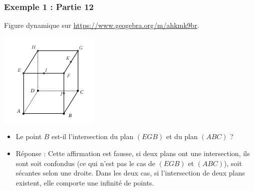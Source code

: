 \documentclass[xcolor=svgnames,t,final]{beamer}
\begin{document}
\begin{frame}

\frametitle{Exemple 1 : Partie 12}

Figure dynamique sur \href{https://www.geogebra.org/m/ahkmk9br}{https://www.geogebra.org/m/ahkmk9br}.


\begin{center}
\includegraphics[scale=0.4]{images/exemple1.png}
\end{center}

\begin{itemize}
\pause \item {\color{blue}  Le point $B$ est-il l'intersection du plan $(EGB)$ et du plan $(ABC)$ ?}
\pause \item {\color{red} Réponse :  Cette affirmation est fausse,  si deux plans ont une intersection, ils sont soit confondus (ce qui n'est pas le cas de $(EGB)$ et  $(ABC)$), soit sécantes selon une droite. Dans les deux cas, si l'intersection de deux plans existent, elle comporte une infinité de points.
}
\end{itemize}


\end{frame}
\end{document}
